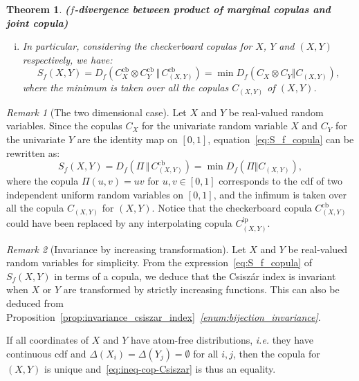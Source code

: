 \documentclass[12pt]{article}
\newcommand{\Cb}{C^\mathrm{cb}}
\newcommand{\Cip}{C^\mathrm{ip}}
\theoremstyle{plain}
\newtheorem{theo}{Theorem}
\theoremstyle{remark}
\newtheorem{rem}{Remark}
\begin{document}
\begin{theo}{\bf ($f$-divergence between product of marginal copulas and joint copula)}
\begin{enumerate}[(i)]
\item \label{it:copu-cb}
  In particular, considering the checkerboard copulas for $X$, $Y$ and $(X,Y)$ respectively, we have:
\begin{equation}
   \label{eq:S_f_copula}
    S_f(X,Y) = D_f(\Cb_X \otimes \Cb_Y \, \Vert\,  \Cb_{(X,Y)})
    = \min D_f(C_X \otimes C_Y \Vert C_{(X,Y)}),
  \end{equation}  
  where the minimum is taken over all the copulas $C_{(X,Y)}$ of $(X,
  Y)$. 
\end{enumerate}
\end{theo}




\begin{rem}[The two dimensional case]
  \label{rem:2d}
Let  $X$ and $Y$ be  real-valued random variables. Since   the  copulas $C_X$ for
the univariate random variable  $X$ and $C_Y$ for the univariate $Y$ are the identity map on
  $[0,1]$,  equation~\eqref{eq:S_f_copula} can be rewritten as:
    \begin{equation} 
    \label{eq:S_f_copula-d=2}
        S_f(X,Y) =   D_f(\Pi \, \Vert\,  \Cb_{(X,Y)})
        = \min D_f(\Pi  \Vert C_{(X,Y)}),
    \end{equation} 
    where the copula $\Pi(u,v)=uv$ for  $u,v\in [0,1]$ corresponds to the
    cdf of two independent uniform random variables on $[0, 1]$, and the
    infimum is taken over all the copula $C_{(X,Y)}$ for $(X,Y)$. Notice
    that the checkerboard copula $\Cb_{(X,Y)}$ could have been replaced
    by any  interpolating copula $\Cip_{(X,Y)}$. 
\end{rem}

\begin{rem}[Invariance by increasing transformation] 
  \label{rem:cop-smooth}
Let  $X$ and $Y$ be  real-valued random variables  for simplicity. 
From the expression~\eqref{eq:S_f_copula} of $S_f(X,Y)$ in terms of a
copula, we  deduce that the Csiszár  index is invariant 
when $X$ or $Y$ are transformed by  strictly increasing functions. This
can also be deduced from
Proposition~\ref{prop:invariance_csiszar_index}~{\it \ref{enum:bijection_invariance}}.
\end{rem}

If all coordinates of $X$ and $Y$ have atom-free distributions, {\it i.e.} they have continuous cdf and  $\Delta(X_i)=\Delta(Y_j)=\emptyset$ for all $i,j$, then the copula for $(X,Y)$ is unique and~\eqref{eq:ineq-cop-Csiszar} is thus an equality. 
\end{document}

